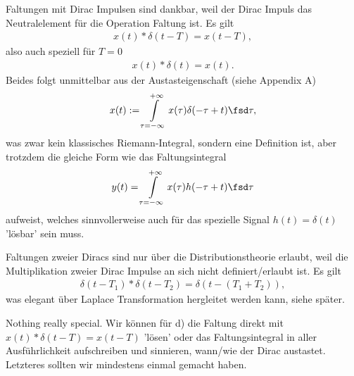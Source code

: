 \begin{Werkzeug}
Faltungen mit Dirac Impulsen sind dankbar, weil der Dirac Impuls das
Neutralelement für die Operation Faltung ist.
Es gilt
\begin{align}
x(t) \ast \delta(t-T) = x(t-T),
\end{align}
also auch speziell für $T=0$
\begin{align}
x(t) \ast \delta(t) = x(t).
\end{align}
Beides folgt unmittelbar aus der Austasteigenschaft (siehe Appendix A)
\begin{align}
x(t) := \int\limits_{\tau = -\infty}^{+\infty} x(\tau) \delta(-\tau+t) \fsd \tau,
\end{align}
was zwar kein klassisches Riemann-Integral, sondern eine Definition ist, aber trotzdem die gleiche Form wie
das Faltungsintegral
\begin{align}
y(t) = \int\limits_{\tau = -\infty}^{+\infty} x(\tau) h(-\tau+t) \fsd \tau
\end{align}
aufweist, welches sinnvollerweise auch für das spezielle Signal $h(t) = \delta(t)$ 'lösbar'
sein muss.

Faltungen zweier Diracs sind nur über die Distributionstheorie erlaubt, weil die Multiplikation zweier Dirac Impulse an sich nicht definiert/erlaubt ist.
Es gilt
\begin{align}
\delta(t-T_1) \ast \delta(t-T_2) = \delta(t-(T_1+T_2)),
\end{align}
was elegant über Laplace Transformation hergleitet werden kann, siehe später.


\end{Werkzeug}
\begin{Ansatz}
Nothing really special. Wir können für d) die Faltung direkt mit $x(t) \ast \delta(t-T) = x(t-T)$ 'lösen' oder das
Faltungsintegral in aller Ausführlichkeit aufschreiben und sinnieren, wann/wie der Dirac austastet.
Letzteres sollten wir mindestens einmal gemacht haben.
\end{Ansatz}
